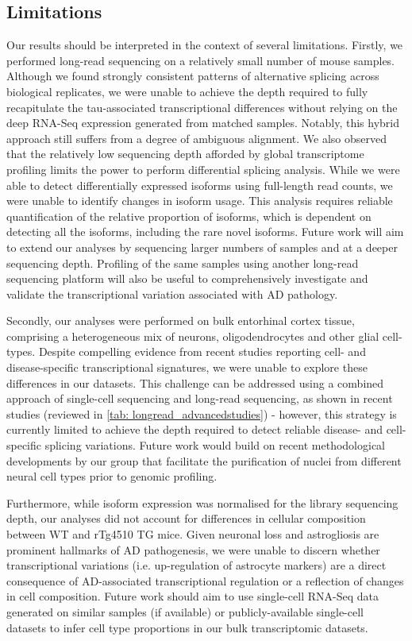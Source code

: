 \subsection{Limitations}
\label{ch5: limitations}
Our results should be interpreted in the context of several limitations. Firstly, we performed long-read sequencing on a relatively small number of mouse samples. Although we found strongly consistent patterns of alternative splicing across biological replicates, we were unable to achieve the depth required to fully recapitulate the tau-associated transcriptional differences without relying on the deep RNA-Seq expression generated from matched samples. Notably, this hybrid approach still suffers from a degree of ambiguous alignment. We also observed that the relatively low sequencing depth afforded by global transcriptome profiling limits the power to perform differential splicing analysis. While we were able to detect differentially expressed isoforms using full-length read counts, we were unable to identify changes in isoform usage. This analysis requires reliable quantification of the relative proportion of isoforms, which is dependent on detecting all the isoforms, including the rare novel isoforms. Future work will aim to extend our analyses by sequencing larger numbers of samples and at a deeper sequencing depth. Profiling of the same samples using another long-read sequencing platform will also be useful to comprehensively investigate and validate the transcriptional variation associated with AD pathology. 

Secondly, our analyses were performed on bulk entorhinal cortex tissue, comprising a heterogeneous mix of neurons, oligodendrocytes and other glial cell-types. Despite compelling evidence from recent studies reporting cell- and disease-specific transcriptional signatures, we were unable to explore these differences in our datasets. This challenge can be addressed using a combined approach of single-cell sequencing and long-read sequencing, as shown in recent studies (reviewed in \cref{tab: longread_advancedstudies}) - however, this strategy is currently limited to achieve the depth required to detect reliable disease- and cell-specific splicing variations. Future work would build on recent methodological developments by our group that facilitate the purification of nuclei from different neural cell types prior to genomic profiling\cite{Stefprotocol}. 

Furthermore, while isoform expression was normalised for the library sequencing depth, our analyses did not account for differences in cellular composition between WT and rTg4510 TG mice. Given neuronal loss and astrogliosis are prominent hallmarks of AD pathogenesis, we were unable to discern whether transcriptional variations (i.e. up-regulation of astrocyte markers) are a direct consequence of AD-associated transcriptional regulation or a reflection of changes in cell composition. Future work should aim to use single-cell RNA-Seq data generated on similar samples (if available) or publicly-available single-cell datasets\cite{Joglekar2021} to infer cell type proportions in our bulk transcriptomic datasets. 

